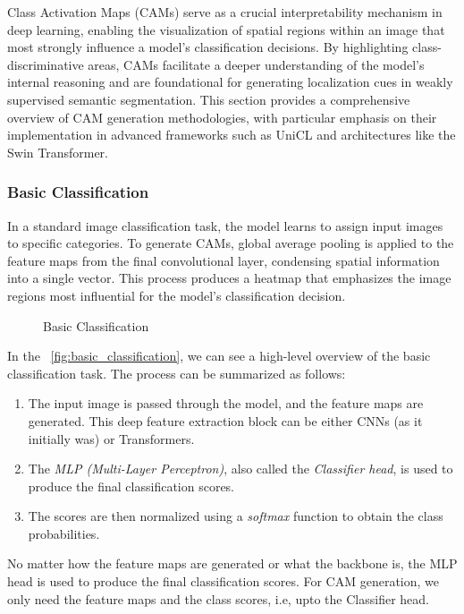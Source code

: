 Class Activation Maps (CAMs) serve as a crucial interpretability mechanism in deep learning, enabling the visualization of spatial regions within an image that most strongly influence a model's classification decisions. By highlighting class-discriminative areas, CAMs facilitate a deeper understanding of the model's internal reasoning and are foundational for generating localization cues in weakly supervised semantic segmentation. This section provides a comprehensive overview of CAM generation methodologies, with particular emphasis on their implementation in advanced frameworks such as UniCL and architectures like the Swin Transformer.

\subsubsection{Basic Classification}
\label{subsec:basic_classification}

In a standard image classification task, the model learns to assign input images to specific categories. To generate CAMs, global average pooling is applied to the feature maps from the final convolutional layer, condensing spatial information into a single vector. This process produces a heatmap that emphasizes the image regions most influential for the model's classification decision.

\begin{figure}[htbp]
    \centering
    \caption{Basic Classification}
    \label{fig:basic_classification}
\end{figure}


In the ~\autoref{fig:basic_classification}, we can see a high-level overview of the basic classification task. The process can be summarized as follows:

\begin{enumerate}
    \item The input image is passed through the model, and the feature maps are generated. This deep feature extraction block can be either CNNs (as it initially was) or Transformers.
    \item The \emph{MLP (Multi-Layer Perceptron)}, also called the \emph{Classifier head}, is used to produce the final classification scores.
    \item The scores are then normalized using a \emph{softmax} function to obtain the class probabilities.
\end{enumerate}

No matter how the feature maps are generated or what the backbone is, the MLP head is used to produce the final classification scores. For CAM generation, we only need the feature maps and the class scores, i.e, upto the Classifier head.

